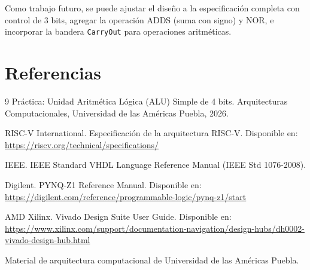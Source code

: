 \documentclass[12pt,letterpaper]{article}
\begin{document}
Como trabajo futuro, se puede ajustar el diseño a la especificación completa con control de 3 bits, agregar la operación ADDS (suma con signo) y NOR, e incorporar la bandera \texttt{CarryOut} para operaciones aritméticas.

\section{Referencias}
\begin{thebibliography}{9}
Práctica: Unidad Aritmética Lógica (ALU) Simple de 4 bits. Arquitecturas Computacionales, Universidad de las Américas Puebla, 2026.

RISC-V International. Especificación de la arquitectura RISC-V. Disponible en: \url{https://riscv.org/technical/specifications/}

IEEE. IEEE Standard VHDL Language Reference Manual (IEEE Std 1076-2008).

Digilent. PYNQ-Z1 Reference Manual. Disponible en: \url{https://digilent.com/reference/programmable-logic/pynq-z1/start}

AMD Xilinx. Vivado Design Suite User Guide. Disponible en: \url{https://www.xilinx.com/support/documentation-navigation/design-hubs/dh0002-vivado-design-hub.html}

Material de arquitectura computacional de Universidad de las Américas Puebla.
\end{thebibliography}
\end{document}
